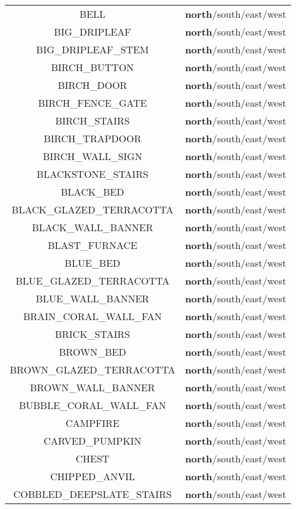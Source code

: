 \begin{longtable}{ |c|c| }
	BELL & \textbf{north}/south/east/west \\
	BIG\_DRIPLEAF & \textbf{north}/south/east/west \\
	BIG\_DRIPLEAF\_STEM & \textbf{north}/south/east/west \\
	BIRCH\_BUTTON & \textbf{north}/south/east/west \\
	BIRCH\_DOOR & \textbf{north}/south/east/west \\
	BIRCH\_FENCE\_GATE & \textbf{north}/south/east/west \\
	BIRCH\_STAIRS & \textbf{north}/south/east/west \\
	BIRCH\_TRAPDOOR & \textbf{north}/south/east/west \\
	BIRCH\_WALL\_SIGN & \textbf{north}/south/east/west \\
	BLACKSTONE\_STAIRS & \textbf{north}/south/east/west \\
	BLACK\_BED & \textbf{north}/south/east/west \\
	BLACK\_GLAZED\_TERRACOTTA & \textbf{north}/south/east/west \\
	BLACK\_WALL\_BANNER & \textbf{north}/south/east/west \\
	BLAST\_FURNACE & \textbf{north}/south/east/west \\
	BLUE\_BED & \textbf{north}/south/east/west \\
	BLUE\_GLAZED\_TERRACOTTA & \textbf{north}/south/east/west \\
	BLUE\_WALL\_BANNER & \textbf{north}/south/east/west \\
	BRAIN\_CORAL\_WALL\_FAN & \textbf{north}/south/east/west \\
	BRICK\_STAIRS & \textbf{north}/south/east/west \\
	BROWN\_BED & \textbf{north}/south/east/west \\
	BROWN\_GLAZED\_TERRACOTTA & \textbf{north}/south/east/west \\
	BROWN\_WALL\_BANNER & \textbf{north}/south/east/west \\
	BUBBLE\_CORAL\_WALL\_FAN & \textbf{north}/south/east/west \\
	CAMPFIRE & \textbf{north}/south/east/west \\
	CARVED\_PUMPKIN & \textbf{north}/south/east/west \\
	CHEST & \textbf{north}/south/east/west \\
	CHIPPED\_ANVIL & \textbf{north}/south/east/west \\
	COBBLED\_DEEPSLATE\_STAIRS & \textbf{north}/south/east/west \\

\end{longtable}
